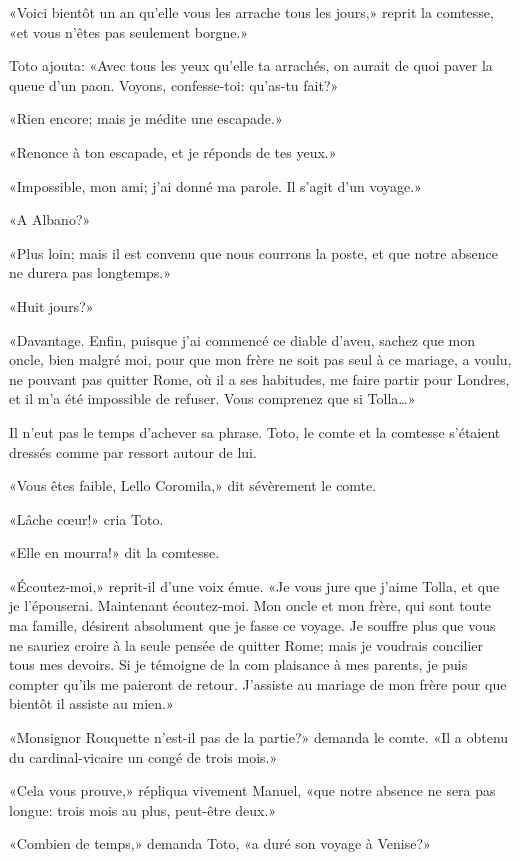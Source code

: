«Voici bientôt un an qu'elle vous les arrache tous les jours,» reprit la
comtesse, «et vous n'êtes pas seulement borgne.»

Toto ajouta: «Avec tous les yeux qu'elle ta arrachés, on aurait de quoi
paver la queue d'un paon. Voyons, confesse-toi: qu'as-tu fait?»

«Rien encore; mais je médite une escapade.»

«Renonce à ton escapade, et je réponds de tes yeux.»

«Impossible, mon ami; j'ai donné ma parole. Il s'agit d'un voyage.»

«A Albano?»

«Plus loin; mais il est convenu que nous courrons la poste, et que notre
absence ne durera pas longtemps.»

«Huit jours?»

«Davantage. Enfin, puisque j'ai commencé ce diable d'aveu, sachez que
mon oncle, bien malgré moi, pour que mon frère ne soit pas seul à ce
mariage, a voulu, ne pouvant pas quitter Rome, où il a ses habitudes, me
faire partir pour Londres, et il m'a été impossible de refuser. Vous
comprenez que si Tolla\ldots»

Il n'eut pas le temps d'achever sa phrase. Toto, le comte et la comtesse
s'étaient dressés comme par ressort autour de lui.

«Vous êtes faible, Lello Coromila,» dit sévèrement le comte.

«Lâche cœur!» cria Toto.

«Elle en mourra!» dit la comtesse.

«Écoutez-moi,» reprit-il d'une voix émue. «Je vous jure que j'aime
Tolla, et que je l'épouserai. Maintenant écoutez-moi. Mon oncle et mon
frère, qui sont toute ma famille, désirent absolument que je fasse ce
voyage. Je souffre plus que vous ne sauriez croire à la seule pensée de
quitter Rome; mais je voudrais concilier tous mes devoirs. Si je
témoigne de la com plaisance à mes parents, je puis compter qu'ils me
paieront de retour. J'assiste au mariage de mon frère pour que bientôt
il assiste au mien.»

«Monsignor Rouquette n'est-il pas de la partie?» demanda le comte. «Il a
obtenu du cardinal-vicaire un congé de trois mois.»

«Cela vous prouve,» répliqua vivement Manuel, «que notre absence ne sera
pas longue: trois mois au plus, peut-être deux.»

«Combien de temps,» demanda Toto, «a duré son voyage à Venise?»

